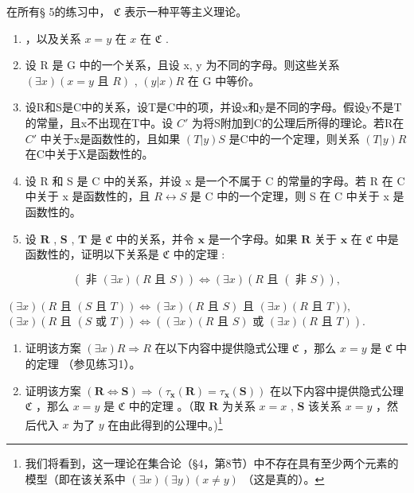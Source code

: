 \exercisegroup

在所有§ 5的练习中， \(\mathfrak{C}\) 表示一种平等主义理论。

\begin{enumerate}
\def\labelenumi{\arabic{enumi}.}
\item
  ，以及关系 \(x = y\) 在 \(x\) 在 \(\mathfrak{C}\) .
\item
  设 R 是 G 中的一个关系，且设 x, y 为不同的字母。则这些关系 \((\exists x)(x = y \text{ 且 } R)\) , \((y|x)R\) 在 G 中等价。
\item
  设R和S是C中的关系，设T是C中的项，并设x和y是不同的字母。假设y不是T的常量，且x不出现在T中。设 \(C'\) 为将S附加到C的公理后所得的理论。若R在 \(C'\) 中关于x是函数性的，且如果 \((T|y)S\) 是C中的一个定理，则关系 \((T|y)R\) 在C中关于X是函数性的。
\item
  设 R 和 S 是 C 中的关系，并设 x 是一个不属于 C 的常量的字母。若 R 在 C 中关于 x 是函数性的，且 \(R \leftrightarrow S\) 是 C 中的一个定理，则 S 在 C 中关于 x 是函数性的。
\item
  设 \(\pmb{R}\) , \(\pmb{S}\) , \(\pmb{T}\) 是 \(\mathfrak{C}\) 中的关系，并令 \(\pmb{x}\) 是一个字母。如果 \(\pmb{R}\) 关于 \(\pmb{x}\) 在 \(\mathfrak{C}\) 中是函数性的，证明以下关系是 \(\mathfrak{C}\) 中的定理 :
\end{enumerate}

\[
(\text { 非   } (\exists x) (R \text {   且   } S)) \iff (\exists x) (R \text {   且   } (\text { 非   } S)),
\]

\((\exists x)(R \text{ 且 } (S \text{ 且 } T)) \Longleftrightarrow (\exists x)(R \text{ 且 } S) \text{ 且 } (\exists x)(R \text{ 且 } T)),\) \((\exists x)(R \text{ 且 } (S \text{ 或 } T)) \Longleftrightarrow ((\exists x)(R \text{ 且 } S) \text{ 或 } (\exists x)(R \text{ 且 } T)).\)

\begin{enumerate}
\def\labelenumi{\arabic{enumi}.}
\setcounter{enumi}{5}
\item
  证明该方案 \((\exists x)R \Longrightarrow R\) 在以下内容中提供隐式公理 \(\mathfrak{C}\) ，那么 \(x = y\) 是 \(\mathfrak{C}\) 中的定理 （参见练习1）。
\item
  证明该方案 \((\pmb{R} \Longleftrightarrow \pmb{S}) \Longrightarrow (\tau_{\pmb{x}}(\pmb{R}) = \tau_{\pmb{x}}(\pmb{S}))\) 在以下内容中提供隐式公理 \(\mathfrak{C}\) ，那么 \(x = y\) 是 \(\mathfrak{C}\) 中的定理 。（取 \(\pmb{R}\) 为关系 \(x = x\) , \(\pmb{S}\) 该关系 \(x = y\) ，然后代入 \(x\) 为了 \(y\) 在由此得到的公理中。)\footnote{我们将看到，这一理论在集合论（§4，第8节）中不存在具有至少两个元素的模型（即在该关系中 \((\exists x)(\exists y)(x \neq y)\) （这是真的）。}
\end{enumerate}

